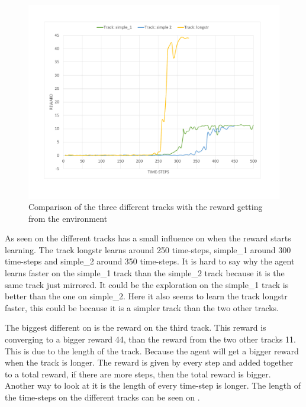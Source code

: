 \begin{figure}[H]
	\centering
	\includegraphics[width=1\textwidth]{Figures/Result/change_of_track_reward_graph.pdf}
	\caption{Comparison of the three different tracks with the reward getting from the environment}
	\label{fig:change_of_track_reward_graph}
\end{figure}

As seen on  the different tracks has a small influence on when the reward starts learning. The track longstr learns around 250 time-steps, simple\_1 around 300 time-steps and simple\_2 around 350 time-steps. It is hard to say why the agent learns faster on the simple\_1 track than the simple\_2 track because it is the same track just mirrored. It could be the exploration on the simple\_1 track is better than the one on simple\_2. Here it also seems to learn the track longstr faster, this could be because it is a simpler track than the two other tracks.  

The biggest different on  is the reward on the third track. This reward is converging to a bigger reward 44, than the reward from the two other tracks 11. This is due to the length of the track. Because the agent will get a bigger reward when the track is longer. The reward is given by every step and added together to a total reward, if there are more steps, then the total reward is bigger. Another way to look at it is the length of every time-step is longer. The length of the time-steps on the different tracks can be seen on .     

